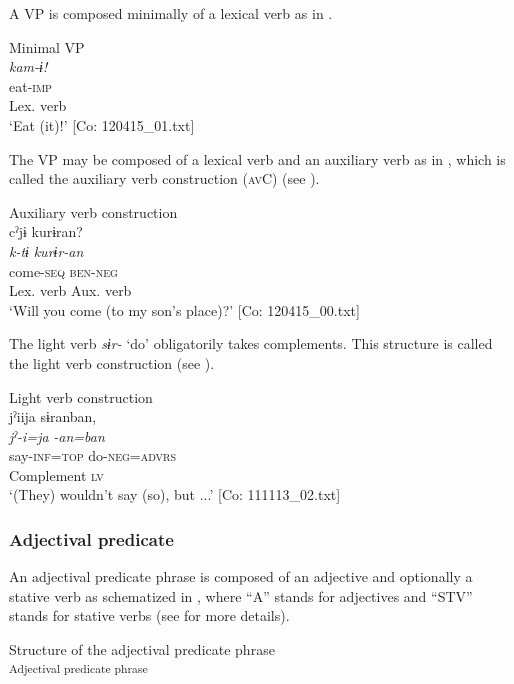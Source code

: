 A VP is composed minimally of a lexical verb as in .

\ea\label{ex:4.6}  Minimal VP\\
    \glll \textit{kam-ɨ!}\\
    eat-\textsc{imp}\\
    {Lex. verb}\\
    \glt     ‘Eat (it)!’   [Co: 120415\_01.txt]
\z

The VP may be composed of a lexical verb and an auxiliary verb as in , which is called the auxiliary verb construction (\textsc{av}C) (see ).

\ea\label{ex:4.7}Auxiliary verb construction\\
    \gllll cˀjɨ  kurɨran?\\
    \textit{k-tɨ}  \textit{kurɨr-an}\\
    come-\textsc{seq}  \textsc{ben}-\textsc{neg}\\
    {Lex. verb}  {Aux. verb}\\
    \glt     ‘Will you come (to my son’s place)?’    [Co: 120415\_00.txt]
\z

The light verb \textit{sɨr-} ‘do’ obligatorily takes complements. This structure is called the light verb construction (see ).

\ea  Light verb construction \label{ex:4.8}\\
    \glll jˀiija  sɨranban,\\
    \textit{jˀ-i=ja}  \textit{-an=ban}\\
    say-\textsc{inf}=\textsc{top}  do-\textsc{neg}=\textsc{advrs}\\
    Complement  \textsc{lv}\\
    \glt ‘(They) wouldn’t say (so), but ...’    [Co: 111113\_02.txt]
\z

\subsubsection{Adjectival predicate}\label{sec:4.1.3.2}

An adjectival predicate phrase is composed of an adjective and optionally a stative verb as schematized in , where “A” stands for adjectives and “STV” stands for stative verbs (see  for more details).

\ea  Structure of the adjectival predicate phrase \label{ex:4.9}\\\textsubscript{Adjectival predicate phrase}
\z

